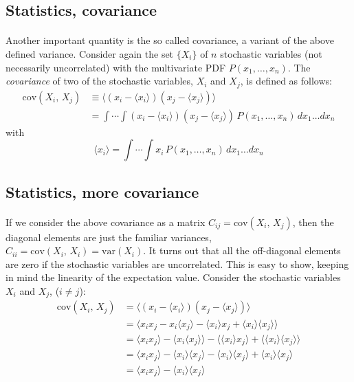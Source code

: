 \documentclass[%
oneside,                 %
final,                   %
10pt]{article}
\begin{document}
\subsection*{Statistics, covariance}

\paragraph{}
Another important quantity is the so called covariance, a variant of
the above defined variance. Consider again the set $\{X_i\}$ of $n$
stochastic variables (not necessarily uncorrelated) with the
multivariate PDF $P(x_1,\dots,x_n)$. The \emph{covariance} of two
of the stochastic variables, $X_i$ and $X_j$, is defined as follows:
\begin{align}
\mathrm{cov}(X_i,\,X_j) &\equiv \langle (x_i-\langle x_i\rangle)(x_j-\langle x_j\rangle)\rangle
\nonumber\\
&=
\int\!\cdots\!\int\!(x_i-\langle x_i \rangle)(x_j-\langle x_j \rangle)\,
P(x_1,\dots,x_n)\,dx_1\dots dx_n
\label{eq:def_covariance}
\end{align}
with
\[
\langle x_i\rangle =
\int\!\cdots\!\int\!x_i\,P(x_1,\dots,x_n)\,dx_1\dots dx_n
\]



\subsection*{Statistics, more covariance}

\paragraph{}
If we consider the above covariance as a matrix $C_{ij}=\mathrm{cov}(X_i,\,X_j)$, then the diagonal elements are just the familiar
variances, $C_{ii} = \mathrm{cov}(X_i,\,X_i) = \mathrm{var}(X_i)$. It turns out that
all the off-diagonal elements are zero if the stochastic variables are
uncorrelated. This is easy to show, keeping in mind the linearity of
the expectation value. Consider the stochastic variables $X_i$ and
$X_j$, ($i\neq j$):
\begin{align}
\mathrm{cov}(X_i,\,X_j) &= \langle(x_i-\langle x_i\rangle)(x_j-\langle x_j\rangle)\rangle\\
&=\langle x_i x_j - x_i\langle x_j\rangle - \langle x_i\rangle x_j + \langle x_i\rangle\langle x_j\rangle\rangle \\
&=\langle x_i x_j\rangle - \langle x_i\langle x_j\rangle\rangle - \langle \langle x_i\rangle x_j\rangle +
\langle \langle x_i\rangle\langle x_j\rangle\rangle\\
&=\langle x_i x_j\rangle - \langle x_i\rangle\langle x_j\rangle - \langle x_i\rangle\langle x_j\rangle +
\langle x_i\rangle\langle x_j\rangle\\
&=\langle x_i x_j\rangle - \langle x_i\rangle\langle x_j\rangle
\end{align}
\end{document}
